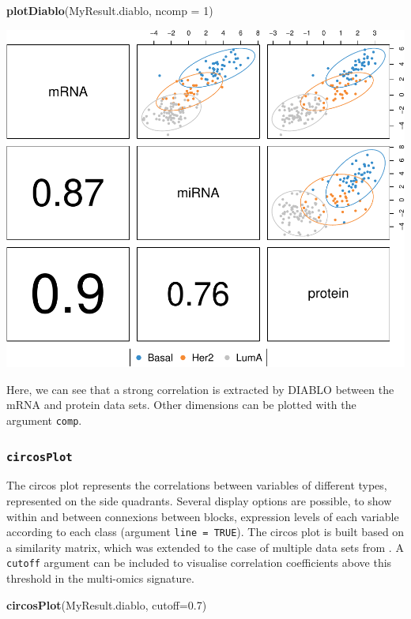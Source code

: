\documentclass[]{book}
\newenvironment{Shaded}{\begin{snugshade}}{\end{snugshade}}
\newcommand{\DataTypeTok}[1]{\textcolor[rgb]{0.13,0.29,0.53}{#1}}
\newcommand{\DecValTok}[1]{\textcolor[rgb]{0.00,0.00,0.81}{#1}}
\newcommand{\FloatTok}[1]{\textcolor[rgb]{0.00,0.00,0.81}{#1}}
\newcommand{\KeywordTok}[1]{\textcolor[rgb]{0.13,0.29,0.53}{\textbf{#1}}}
\newcommand{\NormalTok}[1]{#1}
\begin{document}
\begin{Shaded}
\begin{Highlighting}[]
\KeywordTok{plotDiablo}\NormalTok{(MyResult.diablo, }\DataTypeTok{ncomp =} \DecValTok{1}\NormalTok{)}
\end{Highlighting}
\end{Shaded}

\begin{center}\includegraphics[width=0.5\linewidth,]{Figures/06-diablo-plotDiablo-1} \end{center}

Here, we can see that a strong correlation is extracted by DIABLO between the mRNA and protein data sets. Other dimensions can be plotted with the argument \texttt{comp}.

\hypertarget{circosplot}{%
\subsubsection{\texorpdfstring{\texttt{circosPlot}}{circosPlot}}\label{circosplot}}

The circos plot represents the correlations between variables of different types, represented on the side quadrants. Several display options are possible, to show within and between connexions between blocks, expression levels of each variable according to each class (argument \texttt{line\ =\ TRUE}). The circos plot is built based on a similarity matrix, which was extended to the case of multiple data sets from \citep{Gon12}. A \texttt{cutoff} argument can be included to visualise correlation coefficients above this threshold in the multi-omics signature.

\begin{Shaded}
\begin{Highlighting}[]
\KeywordTok{circosPlot}\NormalTok{(MyResult.diablo, }\DataTypeTok{cutoff=}\FloatTok{0.7}\NormalTok{)}
\end{Highlighting}
\end{Shaded}
\end{document}
